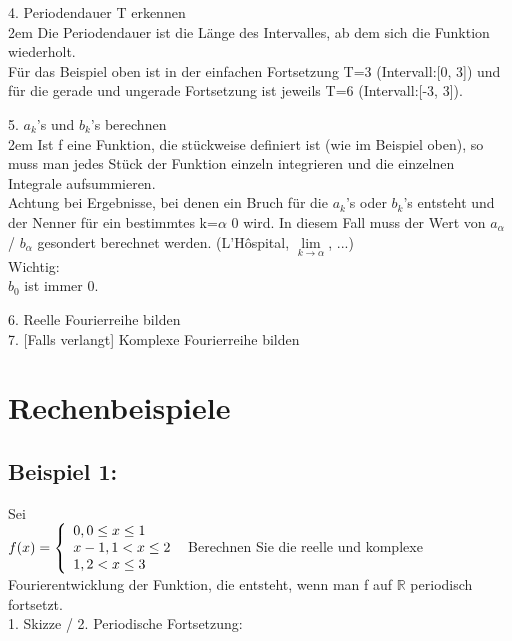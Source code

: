 \documentclass[11pt,final]{scrreprt}
\newcommand{\br} {\medskip\\}
\newcommand{\R} {\mathbb R}
\begin{document}
4. Periodendauer T erkennen\br

\begingroup
\leftskip2em 
Die Periodendauer ist die Länge des Intervalles, ab dem sich die Funktion wiederholt.\\
Für das Beispiel oben ist in der einfachen Fortsetzung T=3 (Intervall:[0, 3]) und für die gerade und ungerade Fortsetzung ist jeweils T=6 (Intervall:[-3, 3]).\\
\par	
\endgroup 

5. $a_k$'s und $b_k$'s berechnen\br

\begingroup
\leftskip2em 
Ist f eine Funktion, die stückweise definiert ist (wie im Beispiel oben), so muss man jedes Stück der Funktion einzeln integrieren und die einzelnen Integrale aufsummieren.\br
Achtung bei Ergebnisse, bei denen ein Bruch für die $a_k$'s oder $b_k$'s entsteht und der Nenner für ein bestimmtes k=$\alpha$ 0 wird. In diesem Fall muss der Wert von $a_\alpha$ / $b_\alpha$ gesondert berechnet werden. (L'Hôspital, $\lim\limits_{k \to \alpha}$, ...) \\
Wichtig:\\
$b_0$ ist immer 0.\\
\par	
\endgroup 
	
6. Reelle Fourierreihe bilden\br

7. [Falls verlangt] Komplexe Fourierreihe bilden\br

\newpage
\section{Rechenbeispiele}

\subsection*{Beispiel 1:}
\bigskip
Sei\\
$
f(x) = \left\{
\begin{array}{l}
0, 0\leq x\leq 1 \\ 
x-1, 1 < x\leq 2 \\
1, 2 < x\leq 3 \\
\end{array}
\right.\\\\
$
Berechnen Sie die reelle und komplexe Fourierentwicklung der Funktion, die entsteht, wenn man f auf $\R$ periodisch fortsetzt.\br


1. Skizze / 2. Periodische Fortsetzung:\\
\end{document}
